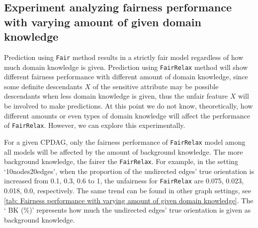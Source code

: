 \documentclass{article}
\begin{document}
\subsection{Experiment analyzing fairness performance with varying amount of given domain knowledge} \label{Appendix: Experiment analyzing fairness performance with varying amount of given domain knowledge}

Prediction using \texttt{Fair} method results in a strictly fair model regardless of how much domain knowledge is given. Prediction using \texttt{FairRelax} method will show different fairness performance with different amount of domain knowledge, since some definite descendants $X$ of the sensitive attribute may be possible descendants when less domain knowledge is given, thus the unfair feature $X$ will be involved to make predictions. At this point we do not know, theoretically, how different amounts or even types of domain knowledge will affect the performance of \texttt{FairRelax}. However, we can explore this experimentally. 

For a given CPDAG, only the fairness performance of \texttt{FairRelax} model among all models will be affected by the amount of background knowledge. The more background knowledge, the fairer the \texttt{FairRelax}. For example, in the setting `10nodes20edges', when the proportion of the undirected edges' true orientation is increased from 0.1, 0.3, 0.6 to 1, the unfairness for \texttt{FairRelax} are 0.075, 0.023, 0.018, 0.0, respectively. The same trend can be found in other graph settings, see \cref{tab: Fairness performance with varying amount of given domain knowledge}. The ` BK (\%)' represents how much the undirected edges' true orientation is given as background knowledge.
\end{document}

